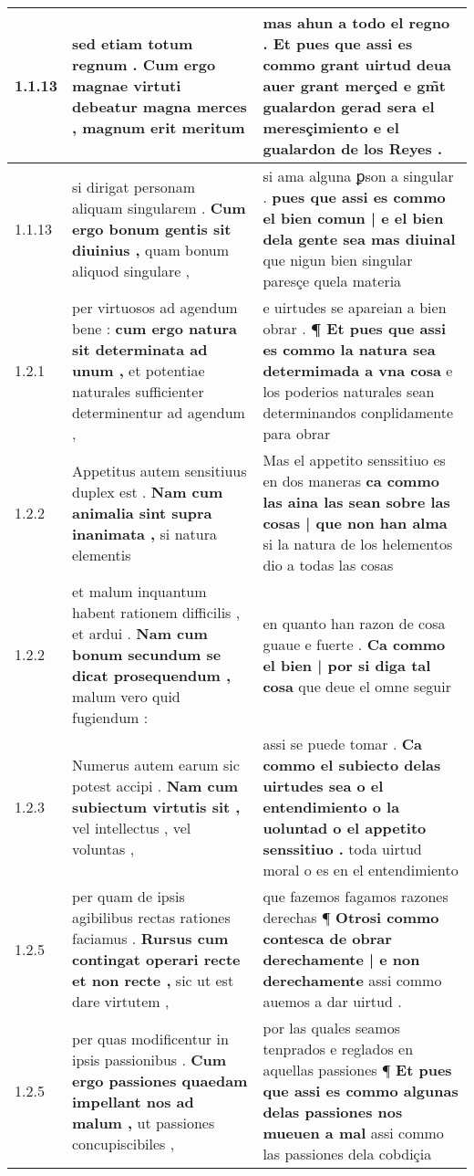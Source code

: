 \begin{tabular}{|p{1cm}|p{6.5cm}|p{6.5cm}|}
1.1.13 & sed etiam totum regnum . \textbf{ Cum ergo magnae virtuti debeatur magna merces , } magnum erit meritum & mas ahun a todo el regno . \textbf{ Et pues que assi es commo grant uirtud deua auer grant merçed } e gm̃t gualardon gerad sera el meresçimiento e el gualardon de los Reyes . \\\hline
1.1.13 & si dirigat personam aliquam singularem . \textbf{ Cum ergo bonum gentis sit diuinius , } quam bonum aliquod singulare , & si ama alguna ꝑson a singular . \textbf{ pues que assi es commo el bien comun | e el bien dela gente sea mas diuinal } que nigun bien singular paresçe quela materia \\\hline
1.2.1 & per virtuosos ad agendum bene : \textbf{ cum ergo natura sit determinata ad unum , } et potentiae naturales sufficienter determinentur ad agendum , & e uirtudes se apareian a bien obrar . \textbf{ ¶ Et pues que assi es commo la natura sea determimada a vna cosa } e los poderios naturales sean determinandos conplidamente para obrar \\\hline
1.2.2 & Appetitus autem sensitiuus duplex est . \textbf{ Nam cum animalia sint supra inanimata , } si natura elementis & Mas el appetito senssitiuo es en dos maneras \textbf{ ca commo las aina las sean sobre las cosas | que non han alma } si la natura de los helementos dio a todas las cosas \\\hline
1.2.2 & et malum inquantum habent rationem difficilis , et ardui . \textbf{ Nam cum bonum secundum se dicat prosequendum , } malum vero quid fugiendum : & en quanto han razon de cosa guaue e fuerte . \textbf{ Ca commo el bien | por si diga tal cosa } que deue el omne seguir \\\hline
1.2.3 & Numerus autem earum sic potest accipi . \textbf{ Nam cum subiectum virtutis sit , } vel intellectus , vel voluntas , & assi se puede tomar . \textbf{ Ca commo el subiecto delas uirtudes sea o el entendimiento o la uoluntad o el appetito senssitiuo . } toda uirtud moral o es en el entendimiento \\\hline
1.2.5 & per quam de ipsis agibilibus rectas rationes faciamus . \textbf{ Rursus cum contingat operari recte et non recte , } sic ut est dare virtutem , & que fazemos fagamos razones derechas ¶ \textbf{ Otrosi commo contesca de obrar derechamente | e non derechamente } assi commo auemos a dar uirtud . \\\hline
1.2.5 & per quas modificentur in ipsis passionibus . \textbf{ Cum ergo passiones quaedam impellant nos ad malum , } ut passiones concupiscibiles , & por las quales seamos tenprados e reglados en aquellas passiones ¶ \textbf{ Et pues que assi es commo algunas delas passiones nos mueuen a mal } assi commo las passiones dela cobdiçia \\\hline

\end{tabular}
